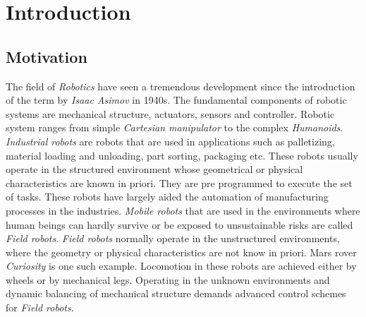 \chapter{Introduction}
\label{sec:einleitung}

\section{Motivation}
The field of \emph{Robotics} have seen a tremendous development since the introduction of the term by \emph{Isaac Asimov} in 1940s. The fundamental components of robotic systems are mechanical structure, actuators, sensors and controller. Robotic system ranges from simple \emph{Cartesian manipulator} to the complex \emph{Humanoids}. \emph{Industrial robots} are robots that are used in applications such as palletizing, material loading and unloading, part sorting, packaging etc. These robots usually operate in the structured environment whose geometrical or physical characteristics are known in priori. They are pre programmed to execute the set of tasks. These robots have largely aided the automation of manufacturing processes in the industries. \emph{Mobile robots} that are used in the environments where human beings can hardly survive or be exposed to unsustainable risks are called \emph{Field robots}. \emph{Field robots} normally operate in the unstructured environments, where the geometry or physical characteristics are not know in priori. Mars rover \emph{Curiosity} is one such example. Locomotion in these robots are achieved either by wheels or by mechanical legs. Operating in the unknown environments and dynamic balancing of mechanical structure demands advanced control schemes for \emph{Field robots}.
